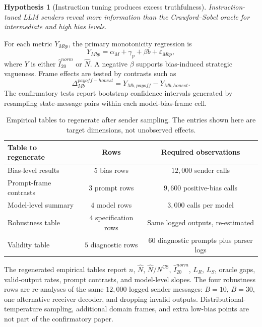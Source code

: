 \documentclass[11pt]{article}
\newtheorem{hypothesis}{Hypothesis}
\newcommand{\NCS}{N^{\mathrm{CS}}}
\begin{document}
\begin{hypothesis}[Instruction tuning produces excess truthfulness]\label{hyp:truth}
Instruction-tuned LLM senders reveal more information than the Crawford--Sobel oracle for intermediate and high bias levels.
\end{hypothesis}

For each metric $Y_{Mbp}$, the primary monotonicity regression is
\begin{equation}\label{eq:slope-test}
    Y_{Mbp}=\alpha_M+\gamma_p+\beta b+\varepsilon_{Mbp},
\end{equation}
where $Y$ is either $\widehat I^{norm}_{20}$ or $\widehat N$.  A negative $\beta$ supports bias-induced strategic vagueness.  Frame effects are tested by contrasts such as
\begin{equation}\label{eq:frame-contrast}
    \Delta^{payoff-honest}_{Mb}=Y_{Mb,payoff}-Y_{Mb,honest}.
\end{equation}
The confirmatory tests report bootstrap confidence intervals generated by resampling state-message pairs within each model-bias-frame cell.

\begin{table}[H]
\centering
\small
\caption{Empirical tables to regenerate after sender sampling.  The entries shown here are target dimensions, not unobserved effects.}
\label{tab:empirical-template}
\begin{tabular}{lcc}
\toprule
Table to regenerate & Rows & Required observations \\
\midrule
Bias-level results & $5$ bias rows & $12{,}000$ sender calls \\
Prompt-frame contrasts & $3$ prompt rows & $9{,}600$ positive-bias calls \\
Model-level summary & $4$ model rows & $3{,}000$ calls per model \\
Robustness table & $4$ specification rows & Same logged outputs, re-estimated \\
Validity table & $5$ diagnostic rows & $60$ diagnostic prompts plus parser logs \\
\bottomrule
\end{tabular}
\end{table}

The regenerated empirical tables report $n$, $\widehat N$, $\widehat N/\NCS$, $\widehat I^{norm}_{20}$, $L_R$, $L_S$, oracle gaps, valid-output rates, prompt contrasts, and model-level slopes.  The four robustness rows are re-analyses of the same $12{,}000$ logged sender messages: $B=10$, $B=30$, one alternative receiver decoder, and dropping invalid outputs.  Distributional-temperature sampling, additional domain frames, and extra low-bias points are not part of the confirmatory paper.
\end{document}
